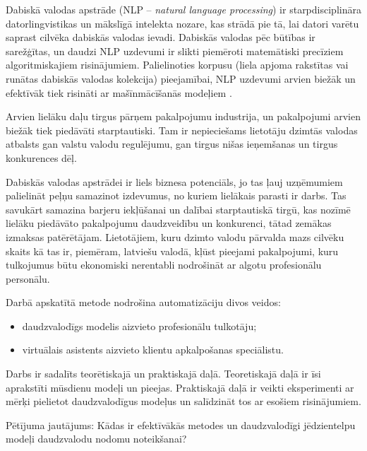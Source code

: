 Dabiskā valodas apstrāde (NLP -- \textit{natural language processing}) ir starpdisciplināra datorlingvistikas un mākslīgā intelekta nozare, kas strādā pie tā, lai datori varētu saprast cilvēka dabiskās valodas ievadi. Dabiskās valodas pēc būtības ir sarežģītas, un daudzi NLP uzdevumi ir slikti piemēroti matemātiski precīziem algoritmiskajiem risinājumiem. Palielinoties korpusu (liela apjoma rakstītas vai runātas dabiskās valodas kolekcija) pieejamībai, NLP uzdevumi arvien biežāk un efektīvāk tiek risināti ar mašīnmācīšanās modeļiem \cite{nlp2018}.


Arvien lielāku daļu tirgus pārņem pakalpojumu industrija,
un pakalpojumi arvien biežāk tiek piedāvāti starptautiski. Tam ir nepieciešams lietotāju dzimtās valodas atbalsts gan valstu valodu regulējumu, gan tirgus nišas ieņemšanas un tirgus konkurences dēļ.

Dabiskās valodas apstrādei ir liels biznesa potenciāls, jo tas ļauj uzņēmumiem palielināt peļņu samazinot izdevumus, no kuriem lielākais parasti ir darbs. %
Tas savukārt samazina barjeru iekļūšanai un dalībai starptautiskā tirgū, kas nozīmē lielāku piedāvāto pakalpojumu daudzveidību un konkurenci, tātad zemākas izmaksas patērētājam. Lietotājiem, kuru dzimto valodu pārvalda mazs cilvēku skaits kā tas ir, piemēram, latviešu valodā, kļūst pieejami pakalpojumi, kuru tulkojumus būtu ekonomiski nerentabli nodrošināt ar algotu profesionālu personālu.

Darbā apskatītā metode nodrošina automatizāciju divos veidos: 
\begin{itemize}
	\item daudzvalodīgs modelis aizvieto profesionālu tulkotāju;
	\item virtuālais asistents aizvieto klientu apkalpošanas speciālistu.
\end{itemize}

Darbs ir sadalīts teorētiskajā un praktiskajā daļā. Teoretiskajā daļā ir īsi aprakstīti mūsdienu modeļi un pieejas. Praktiskajā daļā ir veikti eksperimenti ar mērķi pielietot daudzvalodīgus modeļus un salīdzināt tos ar esošiem risinājumiem.

Pētījuma jautājums: Kādas ir efektīvākās metodes un daudzvalodīgi jēdzientelpu modeļi daudzvalodu nodomu noteikšanai?